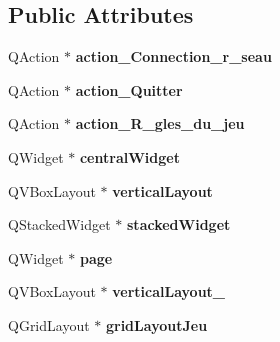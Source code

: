 \subsection*{Public Attributes}
\begin{DoxyCompactItemize}
\item 
\hypertarget{classUi__MainWindow_a6c80311f3167ec9431b5c86203dda5c5}{Q\-Action $\ast$ {\bfseries action\-\_\-\-Connection\-\_\-r\-\_\-seau}}\label{classUi__MainWindow_a6c80311f3167ec9431b5c86203dda5c5}

\item 
\hypertarget{classUi__MainWindow_a16d39d241a02bfb61fab07149d15868f}{Q\-Action $\ast$ {\bfseries action\-\_\-\-Quitter}}\label{classUi__MainWindow_a16d39d241a02bfb61fab07149d15868f}

\item 
\hypertarget{classUi__MainWindow_abe63bbd9a48e3e688fefab2ef89605c0}{Q\-Action $\ast$ {\bfseries action\-\_\-\-R\-\_\-gles\-\_\-du\-\_\-jeu}}\label{classUi__MainWindow_abe63bbd9a48e3e688fefab2ef89605c0}

\item 
\hypertarget{classUi__MainWindow_a30075506c2116c3ed4ff25e07ae75f81}{Q\-Widget $\ast$ {\bfseries central\-Widget}}\label{classUi__MainWindow_a30075506c2116c3ed4ff25e07ae75f81}

\item 
\hypertarget{classUi__MainWindow_aecd96a04789fcfec3f98d80390ad8184}{Q\-V\-Box\-Layout $\ast$ {\bfseries vertical\-Layout}}\label{classUi__MainWindow_aecd96a04789fcfec3f98d80390ad8184}

\item 
\hypertarget{classUi__MainWindow_a8d440a6df1de0bc57afcdda7476d8f19}{Q\-Stacked\-Widget $\ast$ {\bfseries stacked\-Widget}}\label{classUi__MainWindow_a8d440a6df1de0bc57afcdda7476d8f19}

\item 
\hypertarget{classUi__MainWindow_ad7d164376bef8649ee1f94697b859417}{Q\-Widget $\ast$ {\bfseries page}}\label{classUi__MainWindow_ad7d164376bef8649ee1f94697b859417}

\item 
\hypertarget{classUi__MainWindow_a0c01bad60d9f422a1258e710635a2f65}{Q\-V\-Box\-Layout $\ast$ {\bfseries vertical\-Layout\-\_}}\label{classUi__MainWindow_a0c01bad60d9f422a1258e710635a2f65}

\item 
\hypertarget{classUi__MainWindow_a3b659bbe89dcd06d32a7039a432ff110}{Q\-Grid\-Layout $\ast$ {\bfseries grid\-Layout\-Jeu}}\label{classUi__MainWindow_a3b659bbe89dcd06d32a7039a432ff110}


\end{DoxyCompactItemize}

